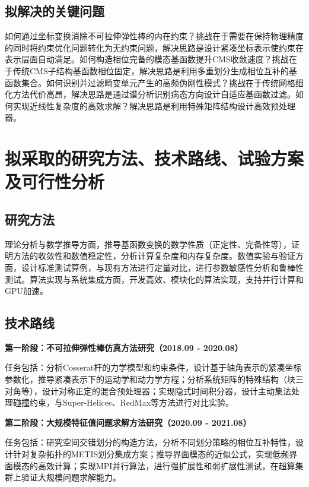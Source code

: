 \subsection{拟解决的关键问题}

如何通过坐标变换消除不可拉伸弹性棒的内在约束？挑战在于需要在保持物理精度的同时将约束优化问题转化为无约束问题，解决思路是设计紧凑坐标表示使约束在表示层面自动满足。如何构造相位完备的模态基函数提升CMS收敛速度？挑战在于传统CMS子结构基函数相位固定，解决思路是利用多重划分生成相位互补的基函数集合。如何识别并过滤畸变单元产生的高频伪刚性模式？挑战在于传统网格细化方法代价高昂，解决思路是通过谱分析识别病态方向设计自适应基函数过滤。如何实现近线性复杂度的高效求解？解决思路是利用特殊矩阵结构设计高效预处理器。

\section{拟采取的研究方法、技术路线、试验方案及可行性分析}

\subsection{研究方法}

理论分析与数学推导方面，推导基函数变换的数学性质（正定性、完备性等），证明方法的收敛性和数值稳定性，分析计算复杂度和内存复杂度。数值实验与验证方面，设计标准测试算例，与现有方法进行定量对比，进行参数敏感性分析和鲁棒性测试。算法实现与系统集成方面，开发高效、模块化的算法实现，支持并行计算和GPU加速。

\subsection{技术路线}

\textbf{第一阶段：不可拉伸弹性棒仿真方法研究（2018.09 - 2020.08）}

任务包括：分析Cosserat杆的力学模型和约束条件，设计基于轴角表示的紧凑坐标参数化，推导紧凑表示下的运动学和动力学方程；分析系统矩阵的特殊结构（块三对角等），设计对称正定的混合预处理器；实现隐式时间积分器，设计主动集法处理碰撞约束，与Super-Helices、RedMax等方法进行对比实验。

\textbf{第二阶段：大规模特征值问题求解方法研究（2020.09 - 2021.08）}

任务包括：研究空间交错划分的构造方法，分析不同划分策略的相位互补特性，设计针对复杂拓扑的METIS划分集成方案；推导界面模态的近似公式，实现低频界面模态的高效计算；实现MPI并行算法，进行强扩展性和弱扩展性测试，在超算集群上验证大规模问题求解能力。

